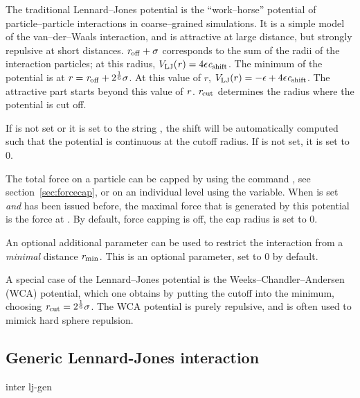 The traditional Lennard--Jones potential is the ``work--horse''
potential of particle--particle interactions in coarse--grained
simulations.  It is a simple model of the van--der--Waals interaction,
and is attractive at large distance, but strongly repulsive at short
distances.  $\mathrm{\mathit{r_\mathrm{off}}} + \mathrm{\mathit{\sigma}}$ corresponds to the
sum of the radii of the interaction particles; at this radius,
$V_\mathrm{LJ}(\mathrm{\mathit{r}}) = 4 \mathrm{\mathit{\epsilon}} \mathrm{\mathit{c_\mathrm{shift}}}$.
The minimum of the potential is at $\mathrm{\mathit{r}} = \mathrm{\mathit{r_\mathrm{off}}} +
2^\frac{1}{6}\mathrm{\mathit{\sigma}}$.  At this value of $r$, $V_\mathrm{LJ}(r) =
-\mathrm{\mathit{\epsilon}} + 4 \mathrm{\mathit{\epsilon}} \mathrm{\mathit{c_\mathrm{shift}}}$. The
attractive part starts beyond this value of $\mathrm{\mathit{r}}$.
$\mathrm{\mathit{r_\mathrm{cut}}}$ determines the radius where the potential is
cut off. 

If  is not set or it is set to the string
, the shift will be automatically computed such that the
potential is continuous at the cutoff radius. If 
is not set, it is set to $0$.

The total force on a particle can be capped by using the command
, see section~\ref{sec:forcecap}, or on an
individual level using the  variable. When
 is set \emph{and}  has been issued before, the maximal force that is generated by
this potential is the force at .  By default,
force capping is off, \ie the cap radius is set to 0.

An optional additional parameter can be used to restrict the
interaction from a \emph{minimal} distance
$\mathrm{\mathit{r_\mathrm{min}}}$. This is an optional parameter, set to 0 by
default.

A special case of the Lennard--Jones potential is the
Weeks--Chandler--Andersen (WCA) potential, which one obtains by
putting the cutoff into the minimum, \ie choosing
$\mathrm{\mathit{r_\mathrm{cut}}}=2^\frac{1}{6}\mathrm{\mathit{\sigma}}$. The WCA potential is
purely repulsive, and is often used to mimick hard sphere repulsion.

\subsection{Generic Lennard-Jones interaction}
\label{sec:GenLennardJones}

\begin{essyntax}
  inter  
  lj-gen
  \var{\epsilon} \var{\sigma} 
    
     
  \begin{features}
  \end{features}
\end{essyntax}

